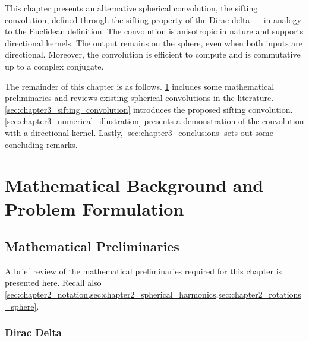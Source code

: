 This chapter presents an alternative spherical convolution, the sifting convolution, defined through the sifting property of the Dirac delta --- in analogy to the Euclidean definition.
The convolution is anisotropic in nature and supports directional kernels.
The output remains on the sphere, even when both inputs are directional.
Moreover, the convolution is efficient to compute and is commutative up to a complex conjugate.

The remainder of this chapter is as follows.
\cref{sec:chapter3_preliminaries} includes some mathematical preliminaries and reviews existing spherical convolutions in the literature.
\cref{sec:chapter3_sifting_convolution} introduces the proposed sifting convolution.
\cref{sec:chapter3_numerical_illustration} presents a demonstration of the convolution with a directional kernel.
Lastly, \cref{sec:chapter3_conclusions} sets out some concluding remarks.

\section{Mathematical Background and Problem Formulation}\label{sec:chapter3_preliminaries}

\subsection{Mathematical Preliminaries}

A brief review of the mathematical preliminaries required for this chapter is presented here.
Recall also \cref{sec:chapter2_notation,sec:chapter2_spherical_harmonics,sec:chapter2_rotations_sphere}.

\subsubsection{Dirac Delta}

